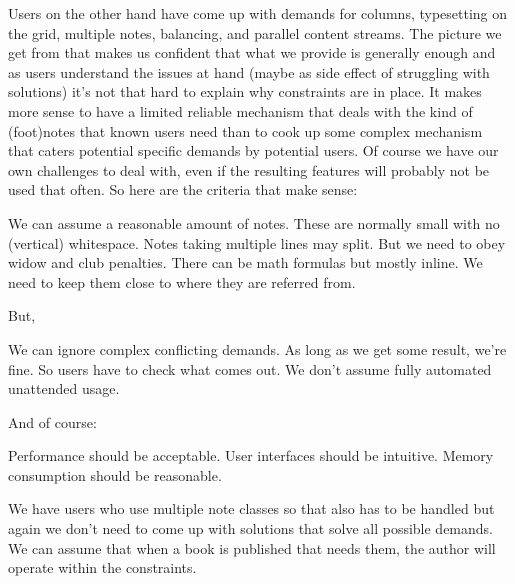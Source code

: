Users on the other hand have come up with demands for columns, typesetting on the
grid, multiple notes, balancing, and parallel content streams. The picture we get
from that makes us confident that what we provide is generally enough and as
users understand the issues at hand (maybe as side effect of struggling with
solutions) it's not that hard to explain why constraints are in place. It makes
more sense to have a limited reliable mechanism that deals with the kind of
(foot)notes that known users need than to cook up some complex mechanism that
caters potential specific demands by potential users. Of course we have our own
challenges to deal with, even if the resulting features will probably not be used
that often. So here are the criteria that make sense:

\startitemize[packed]
\startitem We can assume a reasonable amount of notes. \stopitem
\startitem These are normally small with no (vertical) whitespace. \stopitem
\startitem Notes taking multiple lines may split. \stopitem
\startitem But we need to obey widow and club penalties. \stopitem
\startitem There can be math formulas but mostly inline. \stopitem
\startitem We need to keep them close to where they are referred from. \stopitem
\stopitemize

But,

\startitemize[packed]
\startitem We can ignore complex conflicting demands. \stopitem
\startitem As long as we get some result, we're fine. \stopitem
\startitem So users have to check what comes out. \stopitem
\startitem We don't assume fully automated unattended usage. \stopitem
\stopitemize

And of course:

\startitemize[packed]
\startitem Performance should be acceptable. \stopitem
\startitem User interfaces should be intuitive. \stopitem
\startitem Memory consumption should be reasonable. \stopitem
\stopitemize

We have users who use multiple note classes so that also has to be handled but
again we don't need to come up with solutions that solve all possible demands. We
can assume that when a book is published that needs them, the author will operate
within the constraints.


